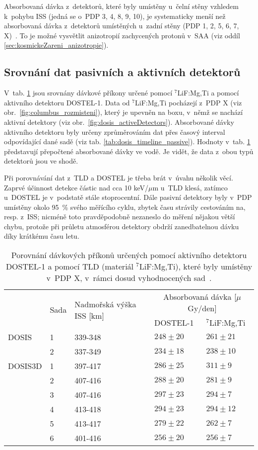 Absorbovaná dávka z~detektorů, které byly umístěny u~čelní stěny vzhledem k~pohybu ISS (jedná se o~PDP 3, 4, 8, 9, 10), je systematicky menší než absorbovaná dávka z~detektorů umístěných u~zadní stěny (PDP 1, 2, 5, 6, 7, X)~\cite{dosis}. To je možné vysvětlit anizotropií zachycených protonů v~SAA (viz oddíl \ref{sec:kosmickeZareni_anizotropie}).
\subsection{Srovnání dat pasivních a aktivních detektorů}%
V~tab. \ref{tab:dosis_vysl_srovnaniPassiveActive} jsou srovnány dávkové příkony určené pomocí $^7$LiF:Mg,Ti a pomocí aktivního detektoru DOSTEL-1. Data od $^7$LiF:Mg,Ti pocházejí z~PDP X (viz obr.~\ref{fig:columbus_rozmisteni}), který je upevněn na boxu, v~němž se nachází aktivní detektory (viz obr.~\ref{fig:dosis_activeDetectors}). Absorbované dávky aktivního detektoru byly určeny zprůměrováním dat přes časový interval odpovídající dané sadě (viz tab. \ref{tab:dosis_timeline_passive}). Hodnoty v~tab. \ref{tab:dosis_vysl_srovnaniPassiveActive} představují přepočtené absorbované dávky ve vodě. Je vidět, že data z~obou typů detektorů jsou ve shodě. 

Při porovnávání dat z~TLD a DOSTEL je třeba brát v~úvahu několik věcí. Zaprvé účinnost detekce částic nad cca 10 keV/$\mu$m u~TLD klesá, zatímco u~DOSTEL je v~podstatě stále stoprocentní. Dále pasivní detektory byly v~PDP umístěny okolo 95~\% svého měřícího cyklu, zbytek času strávily cestováním na, resp. z~ISS; nicméně toto pravděpodobně nezaneslo do měření nějakou větší chybu, protože při průletu atmosférou detektory obdrží zanedbatelnou dávku díky krátkému času letu.
\begin{table}[H]
  \centering
  \footnotesize
  \caption{Porovnání dávkových příkonů určených pomocí aktivního detektoru DOSTEL-1 a pomocí TLD (materiál $^7$LiF:Mg,Ti), které byly umístěny v~PDP X, v~rámci dosud vyhodnocených sad~\cite{dosis}.}
  \label{tab:dosis_vysl_srovnaniPassiveActive}
  \begin{tabular}{lllll}
	\toprule
	&\multirow{2}{*}{Sada}&\multirow{2}{*}{Nadmořská výška ISS [km]}&\multicolumn{2}{c}{Absorbovaná dávka [$\mu$Gy/den]}\\
	 & & &DOSTEL-1&$^7$LiF:Mg,Ti\\
	\midrule
	DOSIS	&1&339-348&$248\pm20$&$261\pm21$\\ 
			&2&337-349&$234\pm18$&$238\pm10$\\
	DOSIS3D	&1&397-417&$286\pm25$&$311\pm9 $\\
			&2&407-416&$288\pm20$&$281\pm9 $\\
			&3&407-416&$297\pm23$&$294\pm7 $\\
			&4&413-418&$294\pm23$&$294\pm12$\\
			&5&413-417&$279\pm22$&$262\pm7 $\\
			&6&401-416&$256\pm20$&$256\pm7 $\\
	\bottomrule
  \end{tabular}
\end{table}

